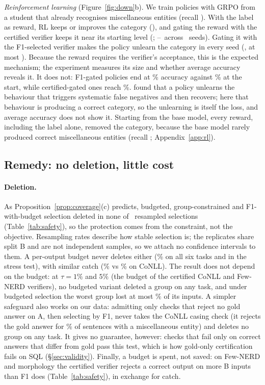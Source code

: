 \documentclass[11pt]{article}
\begin{document}
\emph{Reinforcement learning} (Figure~\ref{fig:down}b). We train policies
with GRPO \citep{shao2024deepseekmath} from a student that already
recognises miscellaneous entities (recall
\rlRecInit). With the label as reward, RL keeps or improves the category
(\rlRecLabel), and gating the reward with the certified verifier keeps it
near its starting level (\rlRecCert; \rlRecMinCert--\rlRecMaxCert\
across \rlNCert\ seeds). Gating it with the F1-selected verifier makes the
policy unlearn the category in every seed (\rlRecFone, at most
\rlRecMaxFone). Because the reward requires the verifier's acceptance,
this is the expected mechanism; the experiment measures its size and
whether average accuracy reveals it. It does not: F1-gated policies end at
\rlAccFone\% accuracy against \rlAccInit\% at the start, while
certified-gated ones reach \rlAccCert\%. \citet{egashira2026delay} found that a policy
unlearns the behaviour that triggers systematic false negatives and then
recovers; here that behaviour is producing a correct category, so the
unlearning is itself the loss, and average accuracy does not show it.
Starting from the base model, every reward, including
the label alone, removed the category, because the base model rarely
produced correct miscellaneous entities (recall \rlRecBase;
Appendix~\ref{app:rl}).

\subsection{Remedy: no deletion, little cost}\label{sec:cost}
\paragraph{Deletion.} As Proposition~\ref{prop:coverage}(c) predicts,
budgeted, group-constrained and F1-with-budget selection deleted in none of
\nRepTotal\ resampled selections (Table~\ref{tab:safety}), so the protection
comes from the constraint, not the objective. Resampling rates describe
how stable selection is; the replicates share split B and are not
independent samples, so we attach no confidence intervals to them. A per-output budget never deletes either (\rdDelOutlvlMax\% on
all six tasks and in the stress test),
with similar catch (\rdCatchOutlvlIE\% vs \rdCatchBudgetIE\% on CoNLL). The
result does not depend on the budget: at $\tau=1\%$ and $5\%$ (the budget
of the certified CoNLL and Few-NERD verifiers), no budgeted variant deleted
a group on any task, and under budgeted selection the worst group lost
at most \bsWorstMax\% of its inputs. A simpler safeguard also works on our
data: admitting only checks that reject no gold answer on A, then
selecting by F1, never takes the CoNLL casing check (it rejects the gold
answer for \advGoldRejA\% of sentences with a miscellaneous entity) and
deletes no group on any task. It gives no guarantee, however: checks that
fail only on correct answers that differ from gold pass this test, which is
how gold-only certification fails on SQL (\S\ref{sec:validity}). Finally,
a budget is spent, not saved: on Few-NERD and morphology the certified
verifier rejects a correct output on more B inputs than F1 does
(Table~\ref{tab:safety}), in exchange for catch.
\end{document}
